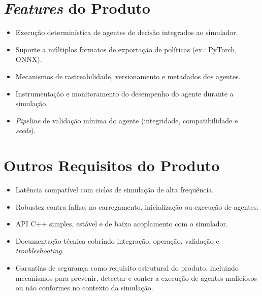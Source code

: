 \section{\emph{Features} do Produto}

\begin{itemize}
    \item Execução determinística de agentes de decisão integrados ao simulador.
    \item Suporte a múltiplos formatos de exportação de políticas (ex.: PyTorch, ONNX).
    \item Mecanismos de rastreabilidade, versionamento e metadados dos agentes.
    \item Instrumentação e monitoramento do desempenho do agente durante a simulação.
    \item \emph{Pipeline} de validação mínima do agente (integridade, compatibilidade e \emph{seeds}).
\end{itemize}

\section{Outros Requisitos do Produto}

\begin{itemize}
    \item Latência compatível com ciclos de simulação de alta frequência.
    \item Robustez contra falhas no carregamento, inicialização ou execução de agentes.
    \item API C++ simples, estável e de baixo acoplamento com o simulador.
    \item Documentação técnica cobrindo integração, operação, validação e \emph{troubleshooting}.
    \item Garantias de segurança como requisito estrutural do produto, incluindo mecanismos para prevenir, detectar e conter a execução de agentes maliciosos ou não conformes no contexto da simulação.
\end{itemize}
